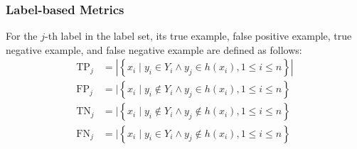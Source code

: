 \subsubsection{Label-based Metrics}
For the $j$-th label in the label set, its true example, false positive example, true negative example, and false negative example are defined as follows:
\begin{align}
	\operatorname{TP}_{j} & =\left|\left\{x_{i} \mid y_{i} \in Y_{i} \wedge y_{j} \in h\left(x_{i}\right), 1 \leq i \leq n\right\}\right| \\
	\operatorname{FP}_{j} & =\mid\left\{x_{i} \mid y_{i} \notin Y_{i} \wedge y_{j} \in h\left(x_{i}\right), 1 \leq i \leq n\right\}       \\
	\operatorname{TN}_{j} & =\mid\left\{x_{i} \mid y_{i} \notin Y_{i} \wedge y_{j} \notin h\left(x_{i}\right), 1 \leq i \leq n\right\}    \\
	\operatorname{FN}_{j} & =\mid\left\{x_{i} \mid y_{i} \in Y_{i} \wedge y_{j} \notin h\left(x_{i}\right), 1 \leq i \leq n\right\}
\end{align}
